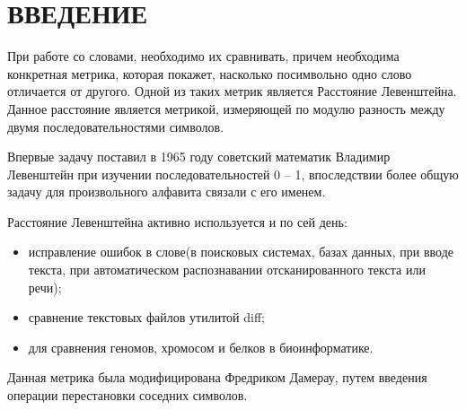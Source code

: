 \chapter*{\hfill{\centering  ВВЕДЕНИЕ}\hfill}


При работе со словами, необходимо их сравнивать, причем необходима конкретная метрика, которая покажет, насколько посимвольно одно слово отличается от другого.
Одной из таких метрик является Расстояние Левенштейна.
Данное расстояние является метрикой, измеряющей по модулю разность между двумя последовательностями символов. \cite{levenshtein}

Впервые задачу поставил в 1965 году советский математик Владимир Левенштейн при изучении последовательностей 0 -- 1, впоследствии более общую задачу для произвольного алфавита связали с его именем.

Расстояние Левенштейна активно используется и по сей день:
\begin{itemize}[label=---]
	\item исправление ошибок в слове(в поисковых системах, базах данных, при вводе текста, при автоматическом распознавании отсканированного текста или речи);
	\item сравнение текстовых файлов утилитой diff;
	\item для сравнения геномов, хромосом и белков в биоинформатике.
\end{itemize}

Данная метрика была модифицирована Фредриком Дамерау, путем введения операции перестановки соседних символов. \cite{Damerau}


